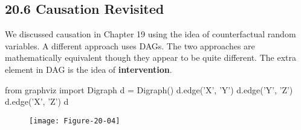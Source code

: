 \subsection*{20.6 Causation Revisited}\label{causation-revisited}
We discussed causation in Chapter 19 using the idea of counterfactual
random variables. A different approach uses DAGs. The two approaches
are mathematically equivalent though they appear to be quite different.
The extra element in DAG is the idea of \textbf{intervention}.

\begin{python}
from graphviz import Digraph
d = Digraph()
d.edge('X', 'Y')
d.edge('Y', 'Z')
d.edge('X', 'Z')
d
\end{python}

\begin{figure}[H]
\centering
\texttt{[image: Figure-20-04]}
\end{figure}

